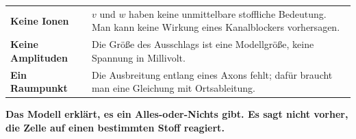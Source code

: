 \begin{warnung}
\begin{center}
{\small
\renewcommand{\arraystretch}{1.5}
\begin{tabular}{@{}P{2.4cm}P{6.2cm}@{}}
\toprule
\textbf{Keine Ionen} & $v$ und $w$ haben keine unmittelbare stoffliche Bedeutung. Man kann keine Wirkung eines Kanalblockers vorhersagen.\\
\textbf{Keine Amplituden} & Die Größe des Ausschlags ist eine Modellgröße, keine Spannung in Millivolt.\\
\textbf{Ein Raumpunkt} & Die Ausbreitung entlang eines Axons fehlt; dafür braucht man eine Gleichung mit Ortsableitung.\\
\bottomrule
\end{tabular}}
\end{center}

\begin{center}
\begin{minipage}{0.9\textwidth}
\textbf{Das Modell erklärt,  es ein Alles-oder-Nichts gibt. Es sagt nicht vorher,  die Zelle auf einen bestimmten Stoff reagiert.}
\end{minipage}
\end{center}

\begin{center}
\begin{minipage}{0.88\textwidth}
\end{minipage}
\end{center}
\end{warnung}

